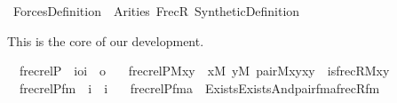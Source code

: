 %
\begin{isabellebody}%
%
%
\isadelimdocument
%
\endisadelimdocument
%
\isatagdocument
%
\isamarkuptrue%
%
\endisatagdocument
{\isafolddocument}%
%
\isadelimdocument
%
\endisadelimdocument
%
\isadelimtheory
%
\endisadelimtheory
%
\isatagtheory
{}\isamarkupfalse%
\ Forces{\isacharunderscore}{\kern0pt}Definition\ \ Arities\ FrecR\ Synthetic{\isacharunderscore}{\kern0pt}Definition\ %
\endisatagtheory
{\isafoldtheory}%
%
\isadelimtheory
%
\endisadelimtheory
%
\begin{isamarkuptext}%
This is the core of our development.%
\end{isamarkuptext}\isamarkuptrue%
%
\isadelimdocument
%
\endisadelimdocument
%
\isatagdocument
%
\isamarkuptrue%
%
\endisatagdocument
{\isafolddocument}%
%
\isadelimdocument
%
\endisadelimdocument
{}\isamarkupfalse%
\isanewline
\ \ frecrelP\ {\isacharcolon}{\kern0pt}{\isacharcolon}{\kern0pt}\ {\isachardoublequoteopen}{\isacharbrackleft}{\kern0pt}i{\isasymRightarrow}o{\isacharcomma}{\kern0pt}i{\isacharbrackright}{\kern0pt}\ {\isasymRightarrow}\ o{\isachardoublequoteclose}\ \isanewline
\ \ {\isachardoublequoteopen}frecrelP{\isacharparenleft}{\kern0pt}M{\isacharcomma}{\kern0pt}xy{\isacharparenright}{\kern0pt}\ {\isasymequiv}\ {\isacharparenleft}{\kern0pt}{\isasymexists}x{\isacharbrackleft}{\kern0pt}M{\isacharbrackright}{\kern0pt}{\isachardot}{\kern0pt}\ {\isasymexists}y{\isacharbrackleft}{\kern0pt}M{\isacharbrackright}{\kern0pt}{\isachardot}{\kern0pt}\ pair{\isacharparenleft}{\kern0pt}M{\isacharcomma}{\kern0pt}x{\isacharcomma}{\kern0pt}y{\isacharcomma}{\kern0pt}xy{\isacharparenright}{\kern0pt}\ {\isasymand}\ is{\isacharunderscore}{\kern0pt}frecR{\isacharparenleft}{\kern0pt}M{\isacharcomma}{\kern0pt}x{\isacharcomma}{\kern0pt}y{\isacharparenright}{\kern0pt}{\isacharparenright}{\kern0pt}{\isachardoublequoteclose}\isanewline
\isanewline
{}\isamarkupfalse%
\isanewline
\ \ frecrelP{\isacharunderscore}{\kern0pt}fm\ {\isacharcolon}{\kern0pt}{\isacharcolon}{\kern0pt}\ {\isachardoublequoteopen}i\ {\isasymRightarrow}\ i{\isachardoublequoteclose}\ \isanewline
\ \ {\isachardoublequoteopen}frecrelP{\isacharunderscore}{\kern0pt}fm{\isacharparenleft}{\kern0pt}a{\isacharparenright}{\kern0pt}\ {\isasymequiv}\ Exists{\isacharparenleft}{\kern0pt}Exists{\isacharparenleft}{\kern0pt}And{\isacharparenleft}{\kern0pt}pair{\isacharunderscore}{\kern0pt}fm{\isacharparenleft}{\kern0pt}{}{\isacharcomma}{\kern0pt}{}{\isacharcomma}{\kern0pt}a{\isacharhash}{\kern0pt}{\isacharplus}{\kern0pt}{}{\isacharparenright}{\kern0pt}{\isacharcomma}{\kern0pt}frecR{\isacharunderscore}{\kern0pt}fm{\isacharparenleft}{\kern0pt}{}{\isacharcomma}{\kern0pt}{}{\isacharparenright}{\kern0pt}{\isacharparenright}{\kern0pt}{\isacharparenright}{\kern0pt}{\isacharparenright}{\kern0pt}{\isachardoublequoteclose}\isanewline

\end{isabellebody}
